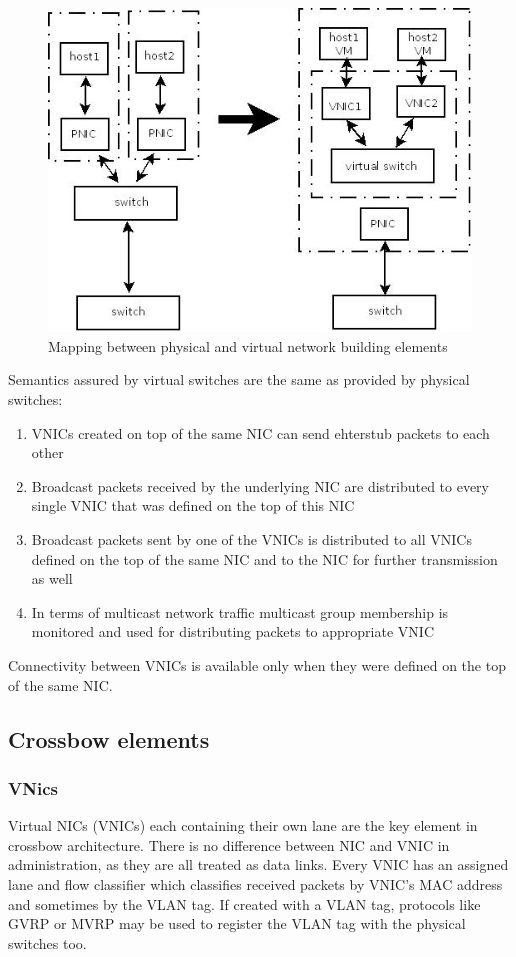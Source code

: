 \documentclass[11pt]{book}
\begin{document}
			\begin{figure}[H]
				\includegraphics[width=\textwidth]{img/physical_and_virtual_switches_mapping.jpeg}
				\caption{Mapping between physical and virtual network building elements}
			\end{figure}
			
			Semantics assured by virtual switches are the same as provided by physical switches: 
			\begin{enumerate}
				\item{VNICs created on top of the same NIC can send ehterstub packets to each other}
				\item{Broadcast packets received by the underlying NIC are distributed to every single VNIC that was defined on the top of this NIC}
				\item{Broadcast packets sent by one of the VNICs is distributed to all VNICs defined on the top of the same NIC and to the NIC for further transmission as well}
				\item{In terms of multicast network traffic multicast group membership is monitored and used for distributing packets to appropriate VNIC}
			\end{enumerate}

			Connectivity between VNICs is available only when they were defined on the top of the same NIC. 

		
		\subsection{Crossbow elements}

			\subsubsection{VNics}
			Virtual NICs (VNICs) each containing their own lane are the key element in crossbow architecture. There is no
			difference between NIC and VNIC in administration, as they are all treated as data links. Every VNIC has an assigned
			lane and flow classifier which classifies received packets by VNIC's MAC address and sometimes by the VLAN tag.
			If created with a VLAN tag, protocols like GVRP or MVRP may be used to register the VLAN tag with the physical switches
			too.	
\end{document}
